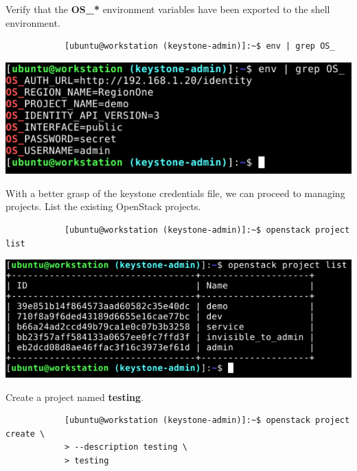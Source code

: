 \documentclass[letterpaper, 12pt]{article}
\begin{document}
\begin{enumerate}
    \begin{labstep}
        Verify that the \textbf{OS\_*} environment variables have been exported to the shell environment.
        \begin{lstlisting}
            [ubuntu@workstation (keystone-admin)]:~$ env | grep OS_
        \end{lstlisting}

        \begin{center}
            \includegraphics[width=\linewidth]{images/part2/step4.png}
        \end{center}
    \end{labstep}

    \begin{labstep}
        With a better grasp of the keystone credentials file, we can proceed to managing projects.
        List the existing OpenStack projects.
        \begin{lstlisting}
            [ubuntu@workstation (keystone-admin)]:~$ openstack project list
        \end{lstlisting}

        \begin{center}
            \includegraphics[width=\linewidth]{images/part2/step5.png}
        \end{center}
    \end{labstep}

    \begin{labstep}
        Create a project named \textbf{testing}.
        \begin{lstlisting}
            [ubuntu@workstation (keystone-admin)]:~$ openstack project create \
            > --description testing \
            > testing
        \end{lstlisting}


\end{labstep}
\end{enumerate}
\end{document}
